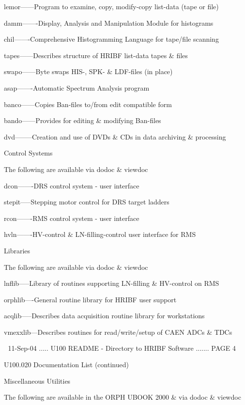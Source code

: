    lemor------Program to examine, copy, modify-copy list-data (tape or file)
 
   damm-------Display, Analysis and Manipulation Module for histograms
 
   chil-------Comprehensive Histogramming Language for tape/file scanning
 
   tapes------Describes structure of HRIBF list-data tapes & files
 
   swapo------Byte swaps HIS-, SPK- & LDF-files (in place)
 
   asap-------Automatic Spectrum Analysis program
 
   banco------Copies Ban-files to/from edit compatible form
 
   bando------Provides for editing & modifying Ban-files
 
   dvd--------Creation and use of DVDs & CDs in data archiving & processing
 
 
 
   Control Systems
 
 
   The following are available via dodoc & viewdoc
 
 
   dcon-------DRS control system - user interface
 
   stepit-----Stepping motor control for DRS target ladders
 
   rcon-------RMS control system - user interface
 
   hvln-------HV-control & LN-filling-control user interface for RMS
 
 
 
   Libraries
 
 
   The following are available via dodoc & viewdoc
 
 
   lnflib-----Library of routines supporting LN-filling & HV-control on RMS
 
   orphlib----General routine library for HRIBF user support
 
   acqlib-----Describes data acquisition routine library for workstations
 
   vmexxlib---Describes routines for read/write/setup of CAEN ADCs & TDCs
 
    
   11-Sep-04 ..... U100  README - Directory to HRIBF Software ....... PAGE   4
 
 
   U100.020  Documentation List (continued)
 
 
   Miscellaneous Utilities
 
 
   The following are available in the ORPH UBOOK 2000 & via dodoc & viewdoc
 
